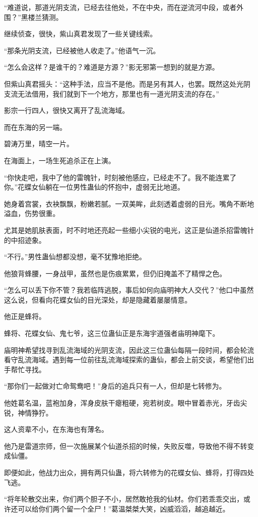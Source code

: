\begin{this_body}
“难道说，那道光阴支流，已经去往他处，不在中央，而在逆流河中段，或者外围？”黑楼兰猜测。

继续侦查，很快，紫山真君发现了一些关键线索。

“那条光阴支流，已经被他人收走了。”他语气一沉。

“怎么会这样？是谁干的？难道是方源？”影无邪第一想到的就是方源。

但紫山真君摇头：“这种手法，应当不是他。而是另有其人，也罢。既然这处光阴支流无法借用，我们就到下一个地方，那里也有一道光阴支流的存在。”

影宗一行四人，很快又离开了乱流海域。

而在东海的另一端。

碧涛万里，晴空一片。

在海面上，一场生死追杀正在上演。

“你快走吧，我中了他的雷魄针，时刻被他感应，已经走不了。我不能连累了你。”花蝶女仙躺在一位男性蛊仙的怀抱中，虚弱无比地道。

她身着宫裳，衣袂飘飘，粉嫩若腻。一双美眸，此刻透着虚弱的目光。嘴角不断地溢血，伤势很重。

尤其是她肌肤表面，时不时地还亮起一些细小尖锐的电光，这正是仙道杀招雷魄针的中招迹象。

“不行。”男性蛊仙想都没想，毫不犹豫地拒绝。

他狼背蜂腰，一身战甲，虽然也是伤痕累累，但仍旧掩盖不了精悍之色。

“怎么可以丢下你不管？我若临阵逃脱，事后如何向庙明神大人交代？”他口中虽然这么说，但看向花蝶女仙的目光深处，却是隐藏着屡屡情意。

他正是蜂将。

蜂将、花蝶女仙、鬼七爷，这三位蛊仙正是东海宇道强者庙明神麾下。

庙明神希望找寻到乱流海域的光阴支流，因此这三位蛊仙每隔一段时间，都会轮流看守乱流海域。遇到每一位前往乱流海域探索的蛊仙，都会上前交谈，希望他们出手帮忙寻找。

“那你们一起做对亡命鸳鸯吧！”身后的追兵只有一人，但却是七转修为。

他姓葛名温，蓝袍加身，浑身皮肤干瘪粗硬，宛若树皮。眼中冒着赤光，牙齿尖锐，神情狰狞。

这人资辈不小，在东海也有薄名。

他乃是雷道宗师，但一次施展某个仙道杀招的时候，失败反噬，导致他不得不转变成仙僵。

即便如此，他战力出众，拥有两只仙蛊，将六转修为的花蝶女仙、蜂将，打得四处飞逃。

“将年轮散交出来，你们两个胆子不小，居然敢抢我的仙材。你们若乖乖交出，或许还可以给你们两个留一个全尸！”葛温桀桀大笑，凶威滔滔，越追越近。


\end{this_body}
